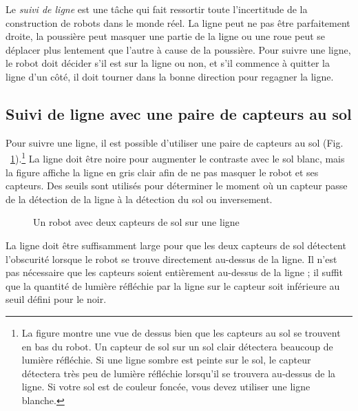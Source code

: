 Le \emph{suivi de ligne} est une tâche qui fait ressortir toute l'incertitude de la construction de robots dans le monde réel. La ligne peut ne pas être parfaitement droite, la poussière peut masquer une partie de la ligne ou une roue peut se déplacer plus lentement que l'autre à cause de la poussière. Pour suivre une ligne, le robot doit décider s'il est sur la ligne ou non, et s'il commence à quitter la ligne d'un côté, il doit tourner dans la bonne direction pour regagner la ligne.


\subsection{Suivi de ligne avec une paire de capteurs au sol}

Pour suivre une ligne, il est possible d'utiliser une paire de capteurs au sol (Fig. ~\ref{fig.ground-on-a-line}).\footnote{La figure montre une vue de dessus bien que les capteurs au sol se trouvent en bas du robot. Un capteur de sol sur un sol clair détectera beaucoup de lumière réfléchie. Si une ligne sombre est peinte sur le sol, le capteur détectera très peu de lumière réfléchie lorsqu'il se trouvera au-dessus de la ligne. Si votre sol est de couleur foncée, vous devez utiliser une ligne blanche.} La ligne doit être noire pour augmenter le contraste avec le sol blanc, mais la figure affiche la ligne en gris clair afin de ne pas masquer le robot et ses capteurs. Des seuils sont utilisés pour déterminer le moment où un capteur passe de la détection de la ligne à la détection du sol ou inversement.

\begin{figure}
\begin{center}
\caption{Un robot avec deux capteurs de sol sur une ligne}\label{fig.ground-on-a-line}
\end{center}
\end{figure}

La ligne doit être suffisamment large pour que les deux capteurs de sol détectent l'obscurité lorsque le robot se trouve directement au-dessus de la ligne. Il n'est pas nécessaire que les capteurs soient entièrement au-dessus de la ligne ; il suffit que la quantité de lumière réfléchie par la ligne sur le capteur soit inférieure au seuil défini pour le noir.

